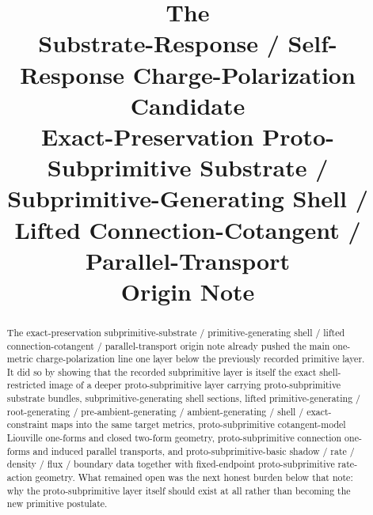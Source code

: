 \documentclass[11pt]{article}
\title{\textbf{The \TheoryName{}}\\[0.4em]
\large Substrate-Response / Self-Response Charge-Polarization Candidate\\
\large Exact-Preservation Proto-Subprimitive Substrate / Subprimitive-Generating Shell / Lifted Connection-Cotangent / Parallel-Transport\\
\large Origin Note}
\author{}
\date{}
\begin{document}
\maketitle

\begin{abstract}
The exact-preservation subprimitive-substrate / primitive-generating shell / lifted connection-cotangent / parallel-transport origin note already pushed the main one-metric charge-polarization line one layer below the previously recorded primitive layer. It did so by showing that the recorded subprimitive layer is itself the exact shell-restricted image of a deeper proto-subprimitive layer carrying proto-subprimitive substrate bundles, subprimitive-generating shell sections, lifted primitive-generating / root-generating / pre-ambient-generating / ambient-generating / shell / exact-constraint maps into the same target metrics, proto-subprimitive cotangent-model Liouville one-forms and closed two-form geometry, proto-subprimitive connection one-forms and induced parallel transports, and proto-subprimitive-basic shadow / rate / density / flux / boundary data together with fixed-endpoint proto-subprimitive rate-action geometry. What remained open was the next honest burden below that note: why the proto-subprimitive layer itself should exist at all rather than becoming the new primitive postulate.


\end{abstract}
\end{document}
